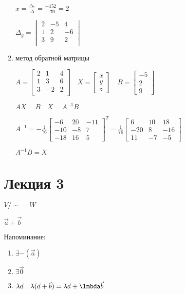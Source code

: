 \documentclass{book}
\theoremstyle{definition}
\begin{document}
\begin{enumerate}
                 $x = \frac{\Delta_x}{\Delta} = \frac{-152}{-76} = 2$

                 $\Delta_y = \begin{vmatrix} 2 & -5 & 4\\ 1 & 2 & -6\\ 3 & 9 & 2\\ \end{vmatrix} $
             \item метод обратной матрицы

                 $A = \begin{bmatrix} 2 & 1 & 4\\ 1 & 3 & 6\\ 3 & -2 & 2\\ \end{bmatrix}\quad X = \begin{bmatrix} x\\y\\z \end{bmatrix} \quad B = \begin{bmatrix} -5\\2\\9 \end{bmatrix}  $

                 $AX = B\quad X = A^{-1}B$

                 $A^{-1} = -\frac{1}{76}\begin{bmatrix} -6 & 20 & -11\\ -10 & -8 & 7\\ -18 & 16 & 5  \end{bmatrix}^T = \frac{1}{76}\begin{bmatrix} 6 & 10 & 18 \\ -20 & 8 & -16 \\ 11 & -7 & -5 \end{bmatrix}  $

                 $A^{-1}B = X$
        \end{enumerate}


        \section{Лекция 3}

        $V / \sim = W$ 

        $\vec a + \vec b$

        Напоминание:
        \begin{enumerate}
            \item $\exists -(\vec a)$
            \item $\exists \vec 0$
            \item $\lambda \vec a\quad \lambda (\vec a  + \vec b) = \lambda \vec a + \lmbda \vec b$
        \end{enumerate}
\end{document}
